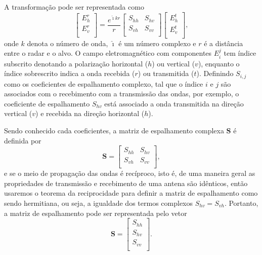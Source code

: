 \documentclass[conference]{IEEEtran}
\begin{document}
A transformação pode ser representada como
\begin{equation}
 \left[
\begin{array}{c}
	E_{h}^{r}   \\
	E_{v}^{r}    \\
\end{array}
\right]
 = \frac{e^{\hat{\imath} kr}}{r}\left[
\begin{array}{cc}
	S_{hh}   & S_{hv}   \\
	S_{vh}   & S_{vv}   \\
\end{array}
\right]
 \left[
\begin{array}{c}
	E_{h}^{t}   \\
	E_{v}^{t}    \\
\end{array}
\right],
\end{equation}
onde $k$ denota o número de onda, $\hat{\imath}$ é um número complexo e $r$ é a distância entre o radar e o alvo. O campo eletromagnético com componentes $E_{i}^{j}$ tem índice subscrito denotando a polarização horizontal ($h$) ou vertical ($v$),  enquanto o índice sobrescrito indica a onda recebida ($r$) ou transmitida ($t$). Definindo $S_{i,j}$ como os coeficientes de espalhamento complexo, tal que o índice $i$ e $j$ são associados com o recebimento com a transmissão das ondas, por exemplo, o coeficiente de espalhamento $S_{hv}$ está associado a onda transmitida na direção vertical ($v$) e recebida na direção horizontal ($h$).

Sendo conhecido cada coeficientes, a matriz de espalhamento complexa $\mathbf{S}$ é definida por
\begin{equation}
\mathbf{S} = \left[
\begin{array}{cc}
	S_{hh}   & S_{hv}   \\
	S_{vh}   & S_{vv}   \\
\end{array}
\right],
\end{equation}
e se o meio de propagação das ondas é recíproco, isto é, de uma maneira geral as propriedades de transmissão e recebimento de uma antena são idênticos, então usaremos o teorema da reciprocidade \cite{lp} para definir a matriz de espalhamento como sendo hermitiana, ou seja, a igualdade dos termos complexos $S_{hv}=S_{vh}$. Portanto, a matriz de espalhamento pode ser representada pelo vetor
\begin{equation}
\mathbf{S} = \left[
\begin{array}{c}
	S_{hh}     \\
    S_{hv}     \\
	S_{vv}     \\
\end{array}
\right].
\end{equation}
\end{document}

